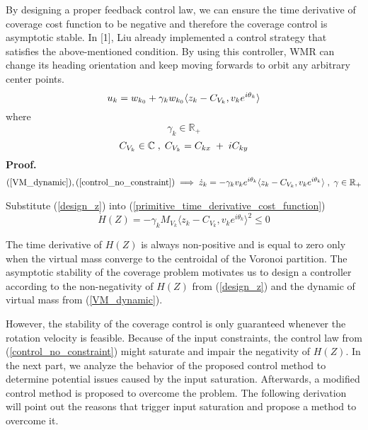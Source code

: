 \noindent By designing a proper feedback control law, we can ensure the time derivative of coverage cost function to be negative and therefore the coverage control is asymptotic stable. In [1], Liu already implemented a control strategy that satisfies the above-mentioned condition. By using this controller, WMR can change its heading orientation and keep moving forwards to orbit any arbitrary center points. 
\begin{equation}\label{control_no_constraint}
u_{k} = w_{k_0} +  \gamma_{k} w_{k_0} \langle{z_{k} - C_{V_{k}},v_{k}e^{i\theta_{k}}}\rangle \\ %
\end{equation}
\noindent where 
\[\gamma_{k} \in \mathbb{R}_+\] 
\[C_{V_{k}} \in \mathbb{C} \txtspc{,} C_{V_k} = C_{kx} \txtspc{+} iC_{ky} \] 
\textbf{Proof.}
\begin{equation} \label{design_z}
\begin{split}
(\ref{VM_dynamic}),(\ref{control_no_constraint}) & \implies  \dot z_k = -\gamma_k v_k e^{i\theta_{k}} \langle{z_k - C_{V_{k}},v_k e^{i\theta_{k}}}\rangle \txtspc{,} \gamma \in \mathbb{R}_+  \\
\end{split}
\end{equation}

\noindent Substitute (\ref{design_z}) into (\ref{primitive_time_derivative_cost_function})
\begin{equation} \label{non_negative_H(Z)}
\dot H(Z) = - \gamma_k M_{V_k}\langle{z_k - C_{V_{k}}, v_{k}e^{i\theta_{k}}}\rangle^2 \leq 0
\end{equation}

\noindent The time derivative of ${H(Z)}$ is always non-positive and is equal to zero only when the virtual mass converge to the centroidal of the Voronoi partition. The asymptotic stability of the coverage problem motivates us to design a controller according to the non-negativity of ${H(Z)}$ from (\ref{design_z}) and the dynamic of virtual mass from (\ref{VM_dynamic}).


\noindent However, the stability of the coverage control is only guaranteed whenever the rotation velocity is feasible. Because of the input constraints, the control law from (\ref{control_no_constraint}) might saturate and impair the negativity of $H(Z)$. In the next part, we analyze the behavior of the proposed control method to determine potential issues caused by the input saturation. Afterwards, a modified control method is proposed to overcome the problem. The following derivation will point out the reasons that trigger input saturation and propose a method to overcome it. 

